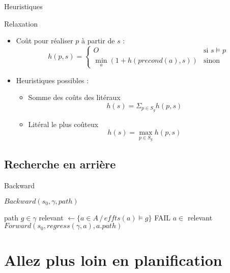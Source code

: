 \documentclass[compress]{beamer}
\begin{document}
\begin{frame}{Heuristiques}
\begin{block}{Relaxation}
	\begin{itemize}
	\item Coût pour réaliser $p$ à partir de $s$ :
	$$h(p,s) = \left\{\begin{array}{ll}
		O & \mbox{si } s \models p\\
		\min_a (1 + h(precond(a), s)) & \mbox{sinon}
		\end{array}\right.$$
	\item Heuristiques possibles :
		\begin{itemize}
		\item Somme des coûts des litéraux
		$$h(s) = \Sigma_{p \in S_g} h(p,s)$$
		\item Litéral le plus coûteux
		$$h(s) = \max_{p \in S_g} h(p,s)$$
		\end{itemize}
	\end{itemize}
\end{block}
\end{frame}

\subsection{Recherche en arrière}
\begin{frame}{Backward}
\begin{block}{$Backward(s_0, \gamma, path)$}
	\begin{algorithmic}
		\RETURN path
	\ELSE
		\STATE {} $g \in \gamma$
		\STATE relevant $\leftarrow \{a \in A \, / \, effts(a) \models g\}$
			\RETURN FAIL
		\ELSE
			\STATE {} $a \in$ relevant
			\RETURN $Forward(s_0, regress(\gamma, a), a.path)$
		\ENDIF
	\ENDIF
	\end{algorithmic}
\end{block}
\end{frame}

\section{Allez plus loin en planification}
\begin{frame}
\tableofcontents[hideothersubsections]
\end{frame}
\end{document}

